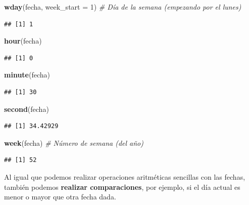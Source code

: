 \documentclass[11pt,]{book}
\newenvironment{Shaded}{\begin{snugshade}}{\end{snugshade}}
\newcommand{\CommentTok}[1]{\textcolor[rgb]{0.37,0.37,0.37}{\textit{#1}}}
\newcommand{\DataTypeTok}[1]{\textcolor[rgb]{0.27,0.27,0.27}{#1}}
\newcommand{\DecValTok}[1]{\textcolor[rgb]{0.06,0.06,0.06}{#1}}
\newcommand{\KeywordTok}[1]{\textcolor[rgb]{0.27,0.27,0.27}{\textbf{#1}}}
\newcommand{\NormalTok}[1]{#1}
\begin{document}
\begin{Shaded}
\begin{Highlighting}[]
\KeywordTok{wday}\NormalTok{(fecha, }\DataTypeTok{week_start =} \DecValTok{1}\NormalTok{) }\CommentTok{# Día de la semana (empezando por el lunes)}
\end{Highlighting}
\end{Shaded}

\begin{verbatim}
## [1] 1
\end{verbatim}

\begin{Shaded}
\begin{Highlighting}[]
\KeywordTok{hour}\NormalTok{(fecha)}
\end{Highlighting}
\end{Shaded}

\begin{verbatim}
## [1] 0
\end{verbatim}

\begin{Shaded}
\begin{Highlighting}[]
\KeywordTok{minute}\NormalTok{(fecha)}
\end{Highlighting}
\end{Shaded}

\begin{verbatim}
## [1] 30
\end{verbatim}

\begin{Shaded}
\begin{Highlighting}[]
\KeywordTok{second}\NormalTok{(fecha)}
\end{Highlighting}
\end{Shaded}

\begin{verbatim}
## [1] 34.42929
\end{verbatim}

\begin{Shaded}
\begin{Highlighting}[]
\KeywordTok{week}\NormalTok{(fecha) }\CommentTok{# Número de semana (del año)}
\end{Highlighting}
\end{Shaded}

\begin{verbatim}
## [1] 52
\end{verbatim}

Al igual que podemos realizar operaciones aritméticas sencillas con las fechas, también podemos \textbf{realizar comparaciones}, por ejemplo, si el día actual es menor o mayor que otra fecha dada.
\end{document}
